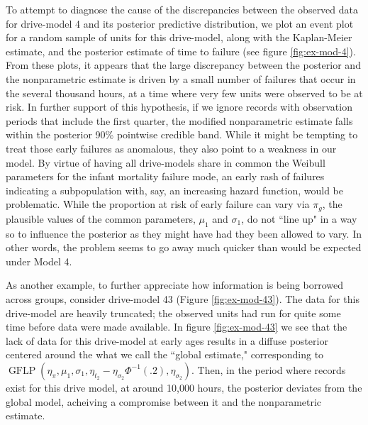 \documentclass[12pt]{article}
\newcommand{\op}{\operatorname}
\begin{document}
To attempt to diagnose the cause of the discrepancies between the observed data for drive-model 4 and its posterior predictive distribution, we plot an event plot for a random sample of units for this drive-model, along with the Kaplan-Meier estimate, and the posterior estimate of time to failure (see figure \ref{fig:ex-mod-4}). From these plots, it appears that the large discrepancy between the posterior and the nonparametric estimate is driven by a small number of failures that occur in the several thousand hours, at a time where very few units were observed to be at risk. In further support of this hypothesis, if we ignore records with observation periods that include the first quarter, the modified nonparametric estimate falls within the posterior 90\% pointwise credible band. While it might be tempting to treat those early failures as anomalous, they also point to a weakness in our model. By virtue of having all drive-models share in common the Weibull parameters for the infant mortality failure mode, an early rash of failures indicating a subpopulation with, say, an increasing hazard function,  would be problematic. While the proportion at risk of early failure can vary via $\pi_g$, the plausible values of the common parameters, $\mu_1$ and $\sigma_1$, do not ``line up" in a way so to influence the posterior as they might have had they been allowed to vary. In other words, the problem seems to go away much quicker than would be expected under Model 4.

As another example, to further appreciate how information is being borrowed across groups, consider drive-model 43 (Figure \ref{fig:ex-mod-43}). The data for this drive-model are heavily truncated; the observed units had run for quite some time before data were made available. In figure \ref{fig:ex-mod-43} we see that the lack of data for this drive-model at early ages results in a diffuse posterior centered around the what we call the ``global estimate," corresponding to $\op{GFLP}(\eta_{\pi}, \mu_1,\sigma_1, \eta_{t_2} - \eta_{\sigma_2}\Phi^{-1}(.2), \eta_{\sigma_2})$. Then, in the period where records exist for this drive model, at around 10,000 hours, the posterior deviates from the global model, acheiving a compromise between it and the nonparametric estimate.
\end{document}
